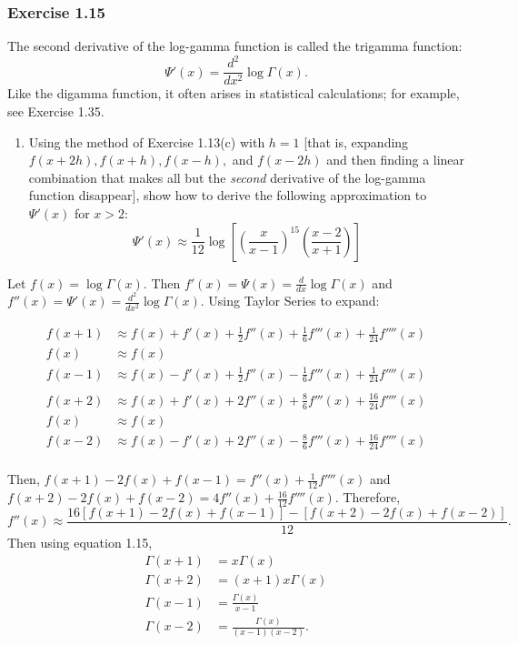 \documentclass[12pt,]{article}
\providecommand{\tightlist}{%
  \setlength{\itemsep}{0pt}\setlength{\parskip}{0pt}}
\begin{document}
\hypertarget{exercise-1.15}{%
\subsubsection{Exercise 1.15}\label{exercise-1.15}}

The second derivative of the log-gamma function is called the trigamma
function: \[\Psi ' (x) = \frac{d^2}{dx^2}\log\Gamma(x).\] Like the
digamma function, it often arises in statistical calculations; for
example, see Exercise 1.35.

\begin{enumerate}
\def\labelenumi{\alph{enumi}.}
\tightlist
\item
  Using the method of Exercise 1.13(c) with \(h = 1\) {[}that is,
  expanding \(f(x+2h), f(x+h), f(x-h),\) and \(f(x-2h)\) and then
  finding a linear combination that makes all but the \textit{second}
  derivative of the log-gamma function disappear{]}, show how to derive
  the following approximation to \(\Psi ' (x)\) for \(x>2:\)
  \[\Psi '(x) \approx \frac{1}{12}\log\left[\left(\frac{x}{x-1}\right)^{15}\left(\frac{x-2}{x+1}\right)\right]\]
\end{enumerate}

Let \(f(x) = \log\Gamma(x).\) Then
\(f'(x) = \Psi(x) = \frac{d}{dx}\log\Gamma(x)\) and
\(f''(x) = \Psi'(x) = \frac{d^2}{dx^2}\log\Gamma(x).\) Using Taylor
Series to expand:

\begin{align*}
f(x+1) & \approx f(x) + f'(x) + \frac{1}{2} f''(x) + \frac{1}{6}f'''(x) + \frac{1}{24}f''''(x)\\
f(x) & \approx f(x)\\
f(x-1) & \approx f(x) - f'(x) + \frac{1}{2} f''(x) - \frac{1}{6}f'''(x) + \frac{1}{24}f''''(x)\\
\\
f(x+2) & \approx f(x) + f'(x) + 2f''(x) + \frac{8}{6}f'''(x) + \frac{16}{24}f''''(x)\\
f(x) & \approx f(x)\\
f(x-2) & \approx f(x) - f'(x) + 2f''(x) - \frac{8}{6}f'''(x) + \frac{16}{24}f''''(x)\\
\end{align*}

Then, \(f(x+1)-2f(x)+f(x-1) = f''(x)+\frac{1}{12}f''''(x)\) and
\(f(x+2)-2f(x)+f(x-2) = 4f''(x)+\frac{16}{12}f''''(x)\). Therefore,
\[f''(x) \approx \frac{16[f(x+1)-2f(x)+f(x-1)]-[f(x+2)-2f(x)+f(x-2)]}{12}.\]
Then using equation 1.15, \begin{align*}
\Gamma(x+1)&=x\Gamma(x)\\
\Gamma(x+2)&=(x+1)x\Gamma(x)\\
\Gamma(x-1)&=\frac{\Gamma(x)}{x-1}\\
\Gamma(x-2)&=\frac{\Gamma(x)}{(x-1)(x-2)}.
\end{align*}
\end{document}
